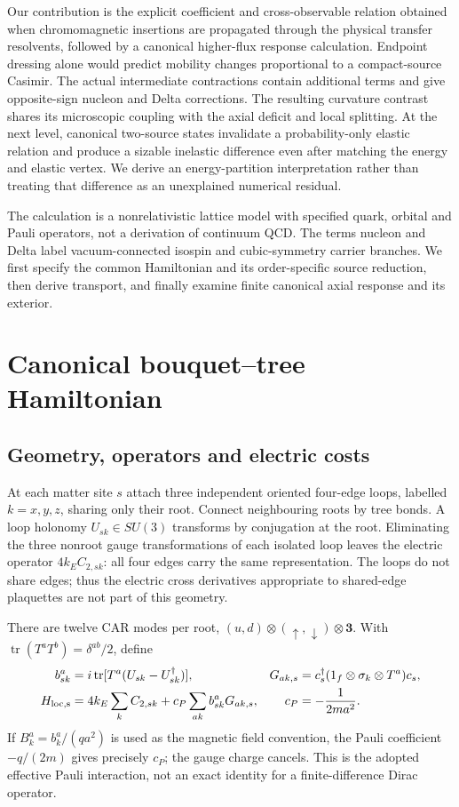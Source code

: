 \documentclass[11pt]{article}
\newcommand{\Tr}{\operatorname{tr}}
\begin{document}
Our contribution is the explicit coefficient and cross-observable relation obtained when chromomagnetic insertions are propagated through the physical transfer resolvents, followed by a canonical higher-flux response calculation. Endpoint dressing alone would predict mobility changes proportional to a compact-source Casimir. The actual intermediate contractions contain additional terms and give opposite-sign nucleon and Delta corrections. The resulting curvature contrast shares its microscopic coupling with the axial deficit and local splitting. At the next level, canonical two-source states invalidate a probability-only elastic relation and produce a sizable inelastic difference even after matching the energy and elastic vertex. We derive an energy-partition interpretation rather than treating that difference as an unexplained numerical residual.

The calculation is a nonrelativistic lattice model with specified quark, orbital and Pauli operators, not a derivation of continuum QCD. The terms nucleon and Delta label vacuum-connected isospin and cubic-symmetry carrier branches. We first specify the common Hamiltonian and its order-specific source reduction, then derive transport, and finally examine finite canonical axial response and its exterior.

\section{Canonical bouquet--tree Hamiltonian}
\subsection{Geometry, operators and electric costs}
At each matter site $s$ attach three independent oriented four-edge loops, labelled $k=x,y,z$, sharing only their root. Connect neighbouring roots by tree bonds. A loop holonomy $U_{sk}\in SU(3)$ transforms by conjugation at the root. Eliminating the three nonroot gauge transformations of each isolated loop leaves the electric operator $4k_E C_{2,sk}$: all four edges carry the same representation. The loops do not share edges; thus the electric cross derivatives appropriate to shared-edge plaquettes are not part of this geometry.

There are twelve CAR modes per root, $(u,d)\otimes(\uparrow,\downarrow)\otimes\mathbf3$. With $\Tr(T^aT^b)=\delta^{ab}/2$, define
\begin{align}
 b_{sk}^a&=i\Tr[T^a(U_{sk}-U_{sk}^\dagger)], &
 G_{ak,s}&=c_s^\dagger(1_f\otimes\sigma_k\otimes T^a)c_s,\\
 H_{\rm loc,s}&=4k_E\sum_k C_{2,sk}+c_P\sum_{ak}b_{sk}^aG_{ak,s}, &
 c_P&=-\frac{1}{2ma^2}. \label{eq:local}
\end{align}
If $B^a_k=b^a_k/(qa^2)$ is used as the magnetic field convention, the Pauli coefficient $-q/(2m)$ gives precisely $c_P$; the gauge charge cancels. This is the adopted effective Pauli interaction, not an exact identity for a finite-difference Dirac operator.
\end{document}
